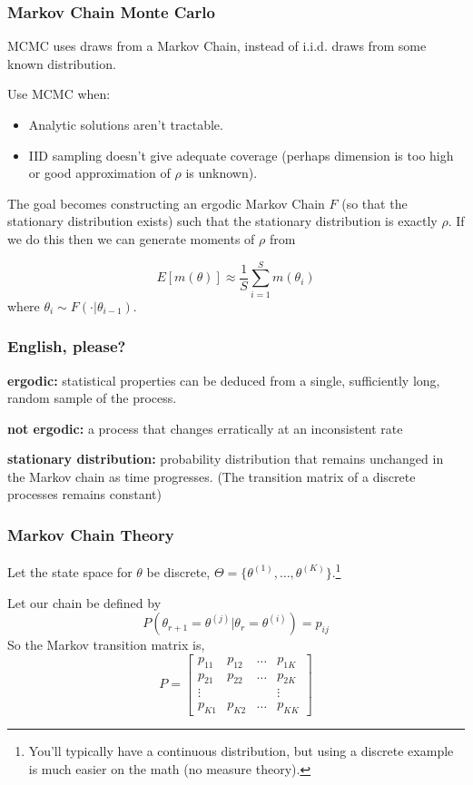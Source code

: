 \documentclass[11pt, aspectratio=169]{beamer}
\begin{document}
\begin{frame}[c]\frametitle{Markov Chain Monte Carlo}
 
MCMC uses draws from a \alert{Markov Chain}, instead of i.i.d. draws from some known distribution. 

\vspace{.5em} 
Use MCMC when:
\begin{itemize}
\item Analytic solutions aren't tractable. 
\item IID sampling doesn't give adequate coverage (perhaps dimension is too high or good approximation of $\rho$ is unknown). 
\end{itemize}


The goal becomes constructing an \alert{ergodic} Markov Chain $F$ (so that the \alert{stationary distribution} exists) such that the stationary
distribution is exactly $\rho$.  If we do this then we can generate moments of $\rho$ from

$$ E[m(\theta)] \approx \frac{1}{S} \sum_{i=1}^S m(\theta_i) $$
where $\theta_i \sim F(\cdot | \theta_{i-1})$. 

\end{frame}


\begin{frame}[c]\frametitle{English, please?}
    

\textbf{ergodic:} statistical properties can be deduced from a single, sufficiently long, random sample of the process. 

\vspace{2em}
\textbf{not ergodic:} a process that changes erratically at an inconsistent rate

\vspace{2em}
\textbf{stationary distribution:} probability distribution that remains unchanged in the Markov chain as time progresses. (The transition matrix of a discrete processes remains constant)

\end{frame}


\begin{frame}[c]\frametitle{Markov Chain Theory}    

Let the state space for $\theta$ be discrete, $\Theta = \{\theta^{(1)}, \ldots, \theta^{(K)} \}$.\footnote{You'll typically have a continuous distribution, but using a discrete example is much easier on the math (no measure theory).} 

\vspace{2em}
Let our chain be defined by
$$P(\theta_{r+1} = \theta^{(j)} | \theta_r = \theta^{(i)}) = p_{ij} $$
So the Markov transition matrix is, 
$$P = \begin{bmatrix} p_{11} & p_{12} & \ldots & p_{1K} \\
 p_{21} & p_{22} & \ldots&  p_{2K} \\
 \vdots & & & \vdots \\
 p_{K1} & p_{K2} & \ldots&  p_{KK} \end{bmatrix}$$

\end{frame}
\end{document}
